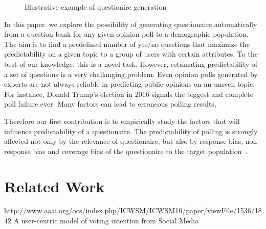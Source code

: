 \documentclass{llncs}
\begin{document}
\begin{figure}[!ht]
\label{fig:illustration}
\centering
\caption{Illustrative example of questionire generation}
\end{figure}



In this paper, we explore the possibility of generating questionaire automatically from a question bank for any given opinion poll to a demographic population. The aim is to find a predefined number of yes/no questions that maximize the predictability on a given topic to a group of users with certain attributes. To the best of our knowledge, this is a novel task. However, estamating predictability of a set of questions is a very challanging problem. Even opinion polls generated by experts are not always reliable in predicting public opinions on an unseen topic. For instance, Donald Trump's election in 2016 signals the biggest and complete poll failure ever. Many factors can lead to erroneous polling results,  

Therefore our first contribution is to empirically study the factors that will influence predictability of a questionaire. The predictability of polling is strongly affected not only by the relevance of questionaire, but also by response bias, non response bias and coverage bias of the questionaire to the target population~\cite{}. 







































%




\section{Related Work}
http://www.aaai.org/ocs/index.php/ICWSM/ICWSM10/paper/viewFile/1536/1842
A user-centric model of voting intention from Social Media
\end{document}
